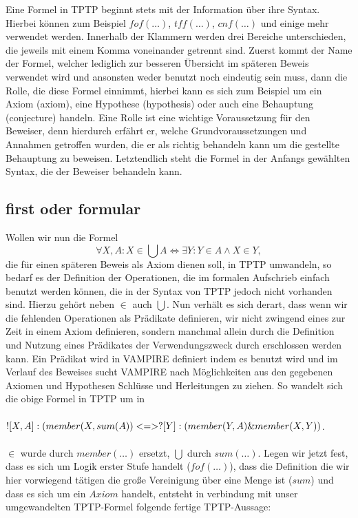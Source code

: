 \documentclass{article}
\begin{document}
Eine Formel in TPTP beginnt stets mit der Information über ihre Syntax. Hierbei können zum Beispiel $fof(\dots)$, $tff(\dots)$, $cnf(\dots)$ und einige mehr verwendet werden.
Innerhalb der Klammern werden drei Bereiche unterschieden, die jeweils mit einem Komma voneinander getrennt sind. 
Zuerst kommt der Name der Formel, welcher lediglich zur besseren Übersicht im späteren Beweis verwendet wird und ansonsten weder benutzt noch eindeutig sein muss,
dann die Rolle, die diese Formel einnimmt, hierbei kann es sich zum Beispiel um ein Axiom (axiom), eine Hypothese (hypothesis) oder auch eine Behauptung (conjecture) handeln.
Eine Rolle ist eine wichtige Voraussetzung für den Beweiser, denn hierdurch erfährt er, welche Grundvoraussetzungen und Annahmen getroffen wurden, die er als richtig behandeln kann um die gestellte Behauptung zu beweisen.
Letztendlich steht die Formel in der Anfangs gewählten Syntax, die der Beweiser behandeln kann.

\subsection{first oder formular}
\label{subsec:tptpfof}
Wollen wir nun die Formel 
\[\forall X,A : X \in \bigcup A \Leftrightarrow \exists Y : Y \in A \land X \in Y,\]
die für einen späteren Beweis als Axiom dienen soll, in TPTP umwandeln, 
so bedarf es der Definition der Operationen, die im formalen Aufschrieb einfach benutzt werden können, 
die in der Syntax von TPTP jedoch nicht vorhanden sind.
Hierzu gehört neben $\in$ auch  $\bigcup$. 
Nun verhält es sich derart, dass wenn wir die fehlenden Operationen als Prädikate definieren, 
wir nicht zwingend eines zur Zeit in einem Axiom definieren, sondern manchmal allein durch die Definition und Nutzung eines Prädikates der Verwendungszweck durch erschlossen werden kann.
Ein Prädikat wird in VAMPIRE definiert indem es benutzt wird und im Verlauf des Beweises sucht VAMPIRE nach Möglichkeiten aus den gegebenen Axiomen und Hypothesen Schlüsse und Herleitungen zu ziehen.
So wandelt sich die obige Formel in TPTP um in \\ \\
$! [X,A] :( member(X,sum(A)) \\ <=> ? [Y] : ( member(Y,A)  \&  member(X,Y))$. \\ \\
$\in$ wurde durch $member(\dots)$ ersetzt, $\bigcup$ durch $sum(\dots)$.
Legen wir jetzt fest, dass es sich um Logik erster Stufe handelt ($fof(\dots)$), dass die Definition die wir hier vorwiegend tätigen die große Vereinigung über eine Menge ist ($sum$) und dass es sich um ein $Axiom$ handelt,
entsteht in verbindung mit unser umgewandelten TPTP-Formel folgende fertige TPTP-Aussage:
\end{document}

